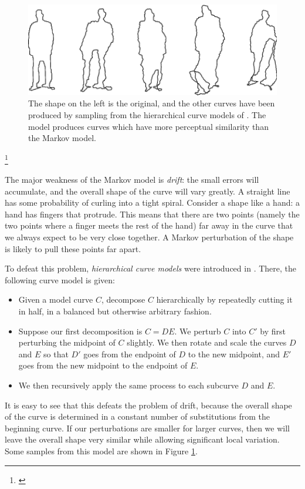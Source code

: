 \begin{figure}
  \centering
\includegraphics[width=120mm]{images/hcm.png}
\caption{The shape on the left is the original, and the other curves
  have been produced by sampling from the hierarchical curve models of
  . The model produces curves which have more perceptual
  similarity than the Markov model. }
\label{fig-hcm}
\end{figure}
\footnote{\cite{hcm}}

The major weakness of the Markov model is \emph{drift}: the small
errors will accumulate, and the overall shape of the curve will vary
greatly. A straight line has some probability of curling into a tight
spiral. Consider a shape like a hand: a hand has fingers that
protrude. This means that there are two points (namely the two points
where a finger meets the rest of the hand) far away in the curve that
we always expect to be very close together. A Markov perturbation of
the shape is likely to pull these points far apart.

To defeat this problem, \emph{hierarchical curve models} were
introduced in \cite{hcm}. There, the following curve model is given:
\begin{itemize}
\item Given a model curve $C$, decompose $C$ hierarchically by
  repeatedly cutting it in half, in a balanced but otherwise arbitrary
  fashion.
\item Suppose our first decomposition is $C=DE$. We perturb $C$ into
  $C'$ by first perturbing the midpoint of $C$ slightly. We then
  rotate and scale the curves $D$ and $E$ so that $D'$ goes from the
  endpoint of $D$ to the new midpoint, and $E'$ goes from the new
  midpoint to the endpoint of $E$.
\item We then recursively apply the same process to each subcurve $D$
  and $E$. 
\end{itemize}
It is easy to see that this defeats the problem of drift, because the
overall shape of the curve is determined in a constant number of
substitutions from the beginning curve. If our perturbations are
smaller for larger curves, then we will leave the overall shape very
similar while allowing significant local variation. Some samples from
this model are shown in Figure \ref{fig-hcm}.

